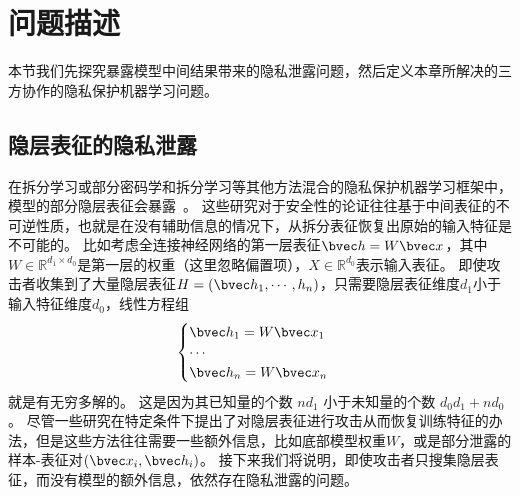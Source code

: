 \section{问题描述}
本节我们先探究暴露模型中间结果带来的隐私泄露问题，然后定义本章所解决的三方协作的隐私保护机器学习问题。

\subsection{隐层表征的隐私泄露}
在拆分学习或部分密码学和拆分学习等其他方法混合的隐私保护机器学习框架中，模型的部分隐层表征会暴露~\cite{zhangqiao_2018_gelu_net,vepakomma2018split,fu2022blindfl,zhou_2022_codesign}。
%
这些研究对于安全性的论证往往基于中间表征的不可逆性质，也就是在没有辅助信息的情况下，从拆分表征恢复出原始的输入特征是不可能的。
%
比如考虑全连接神经网络的第一层表征$\bvec h=W \bvec x$，其中$W \in \mathbb R^{d_1 \times d_0}$是第一层的权重（这里忽略偏置项），$X \in \mathbb R^{d_0}$表示输入表征。
%
即使攻击者收集到了大量隐层表征$H = (\bvec h_1, \cdots, h_n)$，只需要隐层表征维度$d_1$小于输入特征维度$d_0$，线性方程组
\begin{equation}
\begin{cases}
    \bvec h_1 = W \bvec x_1 \\
    \cdots \\
    \bvec h_n = W \bvec x_n \\
\end{cases}
\end{equation}
就是有无穷多解的。
%
这是因为其已知量的个数 $nd_1$ 小于未知量的个数 $d_0d_1 + nd_0$。
%
尽管一些研究在特定条件下提出了对隐层表征进行攻击从而恢复训练特征的办法，但是这些方法往往需要一些额外信息，比如底部模型权重$W$，或是部分泄露的样本-表征对$(\bvec x_i, \bvec h_i)$。
%
接下来我们将说明，即使攻击者只搜集隐层表征，而没有模型的额外信息，依然存在隐私泄露的问题。

